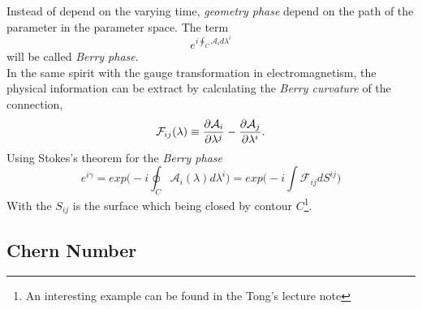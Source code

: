 \documentclass[unnumsec,webpdf,modern,large]{mam-authoring-template}%
\theoremstyle{thmstyleone}%
\theoremstyle{thmstyletwo}%
\theoremstyle{thmstylethree}%
\begin{document}
\begin{appendices}
\quad Instead of depend on the varying time, \textit{geometry phase} depend on the path of the parameter in the parameter space. The term
$$e^{i\oint_C \mathcal{A}_i d \lambda^i}$$
will be called \textit{Berry phase}.\\\null
\quad In the same spirit with the gauge transformation in electromagnetism, the physical information can be extract by calculating the \textit{Berry curvature} of the connection,
\begin{equation}
	\mathcal{F}_{ij}(\lambda) \equiv \pdv{\mathcal{A}_i}{\lambda^j} -\pdv{\mathcal{A}_j}{\lambda^i}.
\end{equation}
\quad Using Stokes's theorem for the \textit{Berry phase}
$$e^{i\gamma} = exp\bigg(-i \oint_C \mathcal{A}_i(\lambda) d\lambda^i\bigg) = exp\bigg(-i \int \mathcal{F}_{ij} dS^{ij}\bigg)$$
With the \(S_{ij}\) is the surface which being closed by contour \(C\)\footnote{An interesting example can be found in the Tong's lecture note}.
\subsection{Chern Number}

\end{appendices}
\end{document}
